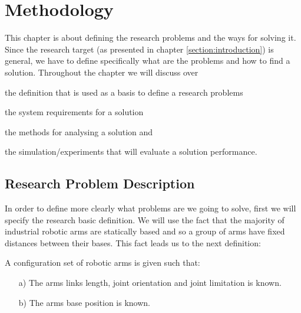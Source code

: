 \section{Methodology}

This chapter is about defining the research problems and the ways for solving it. Since the research target (as presented in chapter \ref{section:introduction}) is general, we have to define specifically what are the problems and how to find a solution. Throughout the chapter we will discuss over
\begin{inparaenum}
\item the definition that is used as a basis to define a research problems
\item the system requirements for a solution
\item the methods for analysing a solution 
and
\item the simulation/experiments that will evaluate a solution performance.
\end{inparaenum} 
 

 


\subsection{Research Problem Description}
\label{section:problem_description}

In order to define more clearly what problems are we going to solve, first we will specify the research basic definition. We will use the fact that the majority of industrial robotic arms are statically based and so a group of arms have fixed distances between their bases. This fact leads us to the next definition:

\begin{definition} \label{def:basic_def}
A configuration set of robotic arms is given such that:
\begin{enumerate}
\item[a)] The arms links length, joint orientation and joint limitation is known.
\item[b)] The arms base position is known.
\end{enumerate}
\end{definition}

